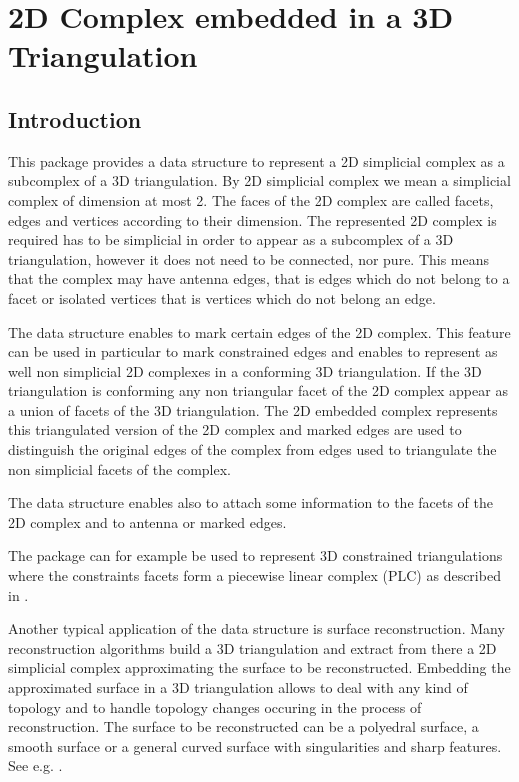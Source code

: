 	
\chapter{2D Complex embedded in a 3D Triangulation}
\label{chapter_Complex2inTriangulation3}
\label{chapter_C2inT3}


\vspace*{-15mm}
\minitoc
\vspace*{30mm}

\section{Introduction}
\label{section_C2inT3_Intro}
This package provides a data structure to  represent a
2D simplicial complex as a subcomplex of a 3D triangulation.
By 2D simplicial complex we mean a simplicial complex of dimension at
most 2. The faces of the 2D complex are called
facets, edges and vertices according to their dimension.
The represented 2D complex is required has to be simplicial 
in order to appear 
as a subcomplex of a 3D triangulation, however 
it does not need to be connected, nor pure.
This   means that the complex may have antenna edges, that is 
edges which do not belong to a facet  or 
isolated vertices that is vertices which do not belong an edge.

The data structure enables to mark certain edges of the 2D complex.
This feature can be used in particular
to mark constrained edges and enables 
to represent as well non simplicial 2D complexes 
in a conforming 3D triangulation.
If the 3D triangulation is conforming any non triangular facet
of the 2D complex appear as a union of facets of the 3D triangulation.
The 2D embedded complex represents this triangulated version of the
2D complex and marked edges are used to distinguish  the original
edges  of the complex from edges used to triangulate
the non simplicial facets of the complex.

The data structure enables also to attach some information to the
facets of the 2D complex and to antenna or marked edges.

The package can for example be used to represent 3D constrained
triangulations where the constraints facets form a piecewise linear
complex (PLC) as described in \cite{s-cgehd-98}.

Another typical application of the data structure is surface
reconstruction. Many reconstruction algorithms
build a 3D triangulation and extract from there
a 2D simplicial complex approximating the surface to be reconstructed.
Embedding the approximated surface in a 3D
triangulation allows to deal with any kind of topology and to handle
topology changes occuring in the process of reconstruction.
The surface to be reconstructed can be 
a polyedral surface, a smooth surface or a general curved surface
with singularities and sharp features. See e.g. \cite{prisme-bo-03}.

